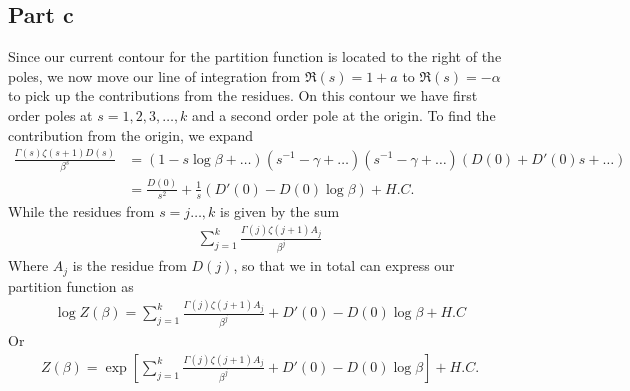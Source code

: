 \documentclass[a4paper,12pt]{article}
\begin{document}
\subsection*{Part c}
Since our current contour for the partition function is located to the right of the poles, we now move our line of integration from $\Re(s)=1+a$ to $\Re(s)=-\alpha$ to pick up the contributions from the residues. On this contour we have first order poles at $s=1,2,3,\dots,k$ and a second order pole at the origin. To find the contribution from the origin, we expand
\begin{equation}
	\begin{aligned}
		\frac{\Gamma(s)\zeta(s+1)D(s)}{\beta^{s}}&=(1-s\log \beta+\dots)(s^{-1}-\gamma+\dots)(s^{-1}-\gamma+\dots)(D(0)+D'(0)s+\dots)
		\\&=\frac{D(0)}{s^2}+\frac{1}{s}(D'(0)-D(0)\log \beta)+H.C.
	\end{aligned}
\end{equation}
While the residues from $s=j\dots, k$ is given by the sum
\begin{equation}
	\begin{aligned}
		\sum_{j=1}^{k}\frac{\Gamma(j)\zeta(j+1)A_j}{\beta^{j}}
	\end{aligned}
\end{equation}
Where $A_j$ is the residue from $D(j)$, so that we in total can express our partition function as
\begin{equation}
\begin{aligned}
\log Z(\beta)=\sum_{j=1}^{k}\frac{\Gamma(j)\zeta(j+1)A_j}{\beta^{j}}+	D'(0)-D(0)\log \beta+H.C
\end{aligned}
\end{equation}
Or
\begin{equation}
	\begin{aligned}
 Z(\beta)=\exp[\sum_{j=1}^{k}\frac{\Gamma(j)\zeta(j+1)A_j}{\beta^{j}}+	D'(0)-D(0)\log \beta]+H.C.
	\end{aligned}
\end{equation}
\end{document}
